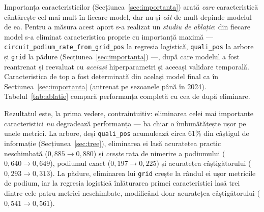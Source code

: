 \documentclass[12pt,a4paper]{report}
\begin{document}
Importanța caracteristicilor (Secțiunea~\ref{sec:importanta}) arată \emph{care} caracteristică
cântărește cel mai mult în fiecare model, dar nu și \emph{cât} de mult depinde modelul de ea. Pentru
a măsura acest aport s-a realizat un \emph{studiu de ablație}: din fiecare model s-a eliminat
caracteristica proprie cu importanță maximă --- \texttt{circuit\_podium\_rate\_from\_grid\_pos} la
regresia logistică, \texttt{quali\_pos} la arbore și \texttt{grid} la pădure
(Secțiunea~\ref{sec:importanta}) ---, după care modelul a fost reantrenat și reevaluat cu
\emph{aceiași} hiperparametri și aceeași validare temporală. Caracteristica de top a fost determinată
din același model final ca în Secțiunea~\ref{sec:importanta} (antrenat pe sezoanele până în 2024).
Tabelul~\ref{tab:ablatie} compară performanța completă cu cea de după eliminare.

\begin{table}[htbp]
  \centering
  \caption{Performanța completă față de cea obținută după eliminarea celei mai importante
    caracteristici a fiecărui model (medii pe sezoanele de test).}
  \label{tab:ablatie}
\end{table}

Rezultatul este, la prima vedere, contraintuitiv: eliminarea celei mai importante caracteristici
\emph{nu} degradează performanța --- ba chiar o îmbunătățește ușor pe unele metrici. La arbore, deși
\texttt{quali\_pos} acumulează circa 61\% din câștigul de informație (Secțiunea~\ref{sec:tree}),
eliminarea ei lasă acuratețea practic neschimbată ($0{,}885 \to 0{,}880$) și \emph{crește} rata de
nimerire a podiumului ($0{,}640 \to 0{,}649$), podiumul exact ($0{,}197 \to 0{,}225$) și acuratețea
câștigătorului ($0{,}293 \to 0{,}313$). La pădure, eliminarea lui \texttt{grid} crește la rândul ei
ușor metricile de podium, iar la regresia logistică înlăturarea primei caracteristici lasă trei dintre
cele patru metrici neschimbate, modificând doar acuratețea câștigătorului ($0{,}541 \to 0{,}561$).
\end{document}
